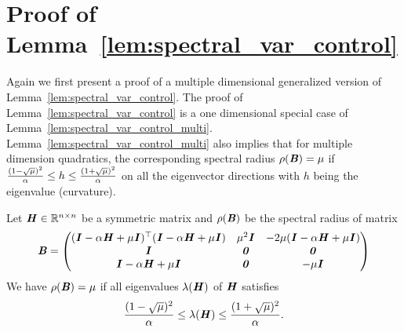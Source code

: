 \section{Proof of Lemma~\ref{lem:spectral_var_control}}
Again we first present a proof of a multiple dimensional generalized version of Lemma~\ref{lem:spectral_var_control}. The proof of Lemma~\ref{lem:spectral_var_control} is a one dimensional special case of Lemma~\ref{lem:spectral_var_control_multi}. Lemma~\ref{lem:spectral_var_control_multi} also implies that for multiple dimension quadratics, the corresponding spectral radius $\rho(\bm{\mathit{B}})=\mu$ if ${(1-\sqrt{\mu})^2\over \alpha} \leq h \leq {(1+\sqrt{\mu})^2\over \alpha}$ on all the eigenvector directions with $h$ being the eigenvalue (curvature).
\begin{lemma}
\label{lem:spectral_var_control_multi}
Let $\bm{\mathit{H}}\in\mathbb{R}^{n\times n}$ be a symmetric matrix and $\rho(\bm{\mathit{B}})$ be the spectral radius of matrix 
\begin{equation}
\bm{\mathit{B}} = {\begin{pmatrix}
(\bm{\mathit{I}}-\alpha \bm{\mathit{H}} + \mu \bm{\mathit{I}})^{\top}(\bm{\mathit{I}}-\alpha \bm{\mathit{H}} + \mu \bm{\mathit{I}}) &  \mu^2 \bm{\mathit{I}} & -2\mu(\bm{\mathit{I}}-\alpha \bm{\mathit{H}} + \mu \bm{\mathit{I}})\\
\bm{\mathit{I}} & \bm{\mathit{0}} & \bm{\mathit{0}} \\
\bm{\mathit{I}}-\alpha \bm{\mathit{H}} + \mu \bm{\mathit{I}} & \bm{\mathit{0}} & - \mu \bm{\mathit{I}} 
\end{pmatrix}}
\end{equation}
We have $\rho(\bm{\mathit{B}})=\mu$ if all eigenvalues $\lambda(\bm{\mathit{H}})$ of $\bm{\mathit{H}}$ satisfies
\begin{equation}
{(1-\sqrt{\mu})^2\over \alpha} \leq \lambda(\bm{\mathit{H}}) \leq {(1+\sqrt{\mu})^2\over \alpha}.
\label{equ:control_condition_var}
\end{equation}


\end{lemma}
